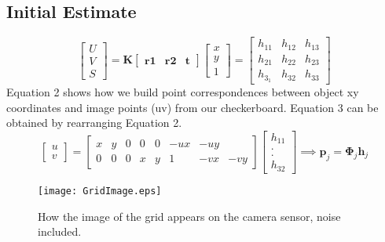 \documentclass[titlepage]{article}
\begin{document}
\subsection{Initial Estimate}
\begin{equation}\label{uv-to-xy}
\begin{bmatrix}
  U\\ 
  V\\ 
  S 
  \end{bmatrix}
        = \textbf{K}
         \begin{bmatrix}
 \textbf{r1} & \textbf{r2} & \textbf{t}
         \end{bmatrix}
        \begin{bmatrix}
  x\\ 
  y\\ 
  1 
  \end{bmatrix}    
       =  \begin{bmatrix}
  h_{11}  & h_{12} & h_{13} \\ 
  h_{21}  & h_{22} & h_{23} \\ 
  h_{3_1}  & h_{32} & h_{33} 
  \end{bmatrix}
        \end{equation}
Equation 2 shows how we build point correspondences between object xy coordinates and image points (uv) from our checkerboard.  Equation 3 can be obtained by rearranging Equation 2.
%
\begin{equation}
    \label{Regressor}
  \begin{bmatrix}
  u\\ 
  v
  \end{bmatrix}
        = 
       \begin{bmatrix}
 x & y & 0 & 0 & 0 & -ux & -uy \\
 0 & 0 & 0 & x & y & 1 & -vx & -vy
  \end{bmatrix}
  \begin{bmatrix}
  h_{11}\\ 
    .\\
    .\\
  h_{32}
  \end{bmatrix}
 \implies \mathbf{p}_{j} = \mathbf{\Phi}_{j}  \mathbf{h}_{j}
      \end{equation}
\begin{wrapfigure}{r}{4.5}
  \begin{center}
    \label{wrap-fig:1}
    \texttt{[image: GridImage.eps]}
  \end{center}
  \caption{How the image of the grid appears on the camera sensor, noise included.}
\end{wrapfigure}
\end{document}
